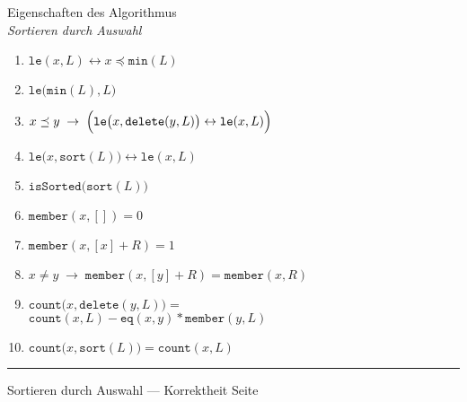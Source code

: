 \documentclass{slides}
\newcounter{mypage}
\begin{document}
\begin{slide}{}
\normalsize

\begin{center}
Eigenschaften des Algorithmus \\ \emph{Sortieren durch Auswahl}
\end{center}
\vspace*{0.5cm}

\footnotesize
\begin{enumerate}
\item $\mathtt{le}(x, L) \leftrightarrow x \preceq \texttt{min}(L)$
\item $\mathtt{le}\bigl(\mathtt{min}(L), L\bigr)$
\item $x \preceq y \;\rightarrow\; \Bigl(\mathtt{le}\bigl(x,\mathtt{delete}(y,L)\bigr) \leftrightarrow \mathtt{le}(x, L)\Bigr)$
\item $\mathtt{le}\bigl(x, \mathtt{sort}(L)\bigr) \leftrightarrow \mathtt{le}(x, L)$
\item $\mathtt{isSorted}\bigl(\mathtt{sort}(L)\bigr)$
\item $\mathtt{member}(x,[]) = 0$
\item $\mathtt{member}(x,[x] + R) = 1$
\item $x \not= y \;\rightarrow\; \mathtt{member}(x,[y] + R) = \mathtt{member}(x,R)$
\item $\mathtt{count}\bigl(x, \mathtt{delete}(y,L)\bigr) = $ \\[0.3cm]
      \hspace*{1.3cm} $\mathtt{count}(x,L) - \mathtt{eq}(x,y)*\mathtt{member}(y,L)$
\item $\mathtt{count}\bigl(x, \mathtt{sort}(L)\bigr) = \mathtt{count}(x, L)$
\end{enumerate}

\vspace*{\fill}
\tiny \addtocounter{mypage}{1}
\rule{17cm}{1mm}
Sortieren durch Auswahl --- Korrektheit \hspace*{\fill} Seite 
\end{slide}

\end{document}
